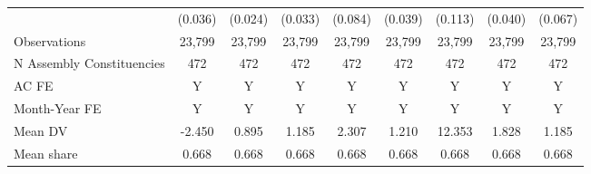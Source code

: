 {\begin{tabular}{l*{8}{c}}
            &     (0.036)         &     (0.024)         &     (0.033)         &     (0.084)         &     (0.039)         &     (0.113)         &     (0.040)         &     (0.067)         \\
Observations&      23,799         &      23,799         &      23,799         &      23,799         &      23,799         &      23,799         &      23,799         &      23,799         \\
N Assembly Constituencies&         472         &         472         &         472         &         472         &         472         &         472         &         472         &         472         \\
AC FE       &           Y         &           Y         &           Y         &           Y         &           Y         &           Y         &           Y         &           Y         \\
Month-Year FE&           Y         &           Y         &           Y         &           Y         &           Y         &           Y         &           Y         &           Y         \\
Mean DV     &      -2.450         &       0.895         &       1.185         &       2.307         &       1.210         &      12.353         &       1.828         &       1.185         \\
Mean share  &       0.668         &       0.668         &       0.668         &       0.668         &       0.668         &       0.668         &       0.668         &       0.668         \\
\bottomrule
\end{tabular}
}
